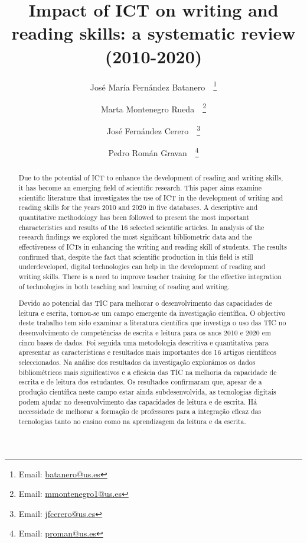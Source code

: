 \documentclass[english]{textolivre}
\title{Impact of ICT on writing and reading skills: a systematic review (2010-2020)}
\author[1]{José María Fernández Batanero~\orcid{0000-0003-4097-5382}~\thanks{Email: \url{batanero@us.es}}}
\author[1]{Marta Montenegro Rueda~\orcid{0000-0003-4733-289X}~\thanks{Email: \url{mmontenegro1@us.es}}}
\author[1]{José Fernández Cerero~\orcid{0000-0002-2745-6986}~\thanks{Email: \url{jfcerero@us.es}}}
\author[1]{Pedro Román Gravan~\orcid{0000-0002-1646-9247}~\thanks{Email: \url{proman@us.es}}}
\affil[1]{Universidad de Sevilla, Facultad de Ciencias de la Educación, Departamento de Didáctica y Organización Educativa, Sevilla, España.}
\begin{document}
\maketitle

\begin{polyabstract}
\begin{abstract}
Due to the potential of ICT to enhance the development of reading and writing skills, it has become an emerging field of scientific research. This paper aims examine scientific literature that investigates the use of ICT in the development of writing and reading skills for the years 2010 and 2020 in five databases. A descriptive and quantitative methodology has been followed to present the most important characteristics and results of the 16 selected scientific articles. In analysis of the research findings we explored the most significant bibliometric data and the effectiveness of ICTs in enhancing the writing and reading skill of students. The results confirmed that, despite the fact that scientific production in this field is still underdeveloped, digital technologies can help in the development of reading and writing skills. There is a need to improve teacher training for the effective integration of technologies in both teaching and learning of reading and writing.

\end{abstract}

\begin{portuguese}
\begin{abstract}
Devido ao potencial das TIC para melhorar o desenvolvimento das capacidades de leitura e escrita, tornou-se um campo emergente da investigação científica. O objectivo deste trabalho tem sido examinar a literatura científica que investiga o uso das TIC no desenvolvimento de competências de escrita e leitura para os anos 2010 e 2020 em cinco bases de dados. Foi seguida uma metodologia descritiva e quantitativa para apresentar as características e resultados mais importantes dos 16 artigos científicos seleccionados. Na análise dos resultados da investigação explorámos os dados bibliométricos mais significativos e a eficácia das TIC na melhoria da capacidade de escrita e de leitura dos estudantes. Os resultados confirmaram que, apesar de a produção científica neste campo estar ainda subdesenvolvida, as tecnologias digitais podem ajudar no desenvolvimento das capacidades de leitura e de escrita. Há necessidade de melhorar a formação de professores para a integração eficaz das tecnologias tanto no ensino como na aprendizagem da leitura e da escrita.

\end{abstract}
\end{portuguese}

\end{polyabstract}
\end{document}
